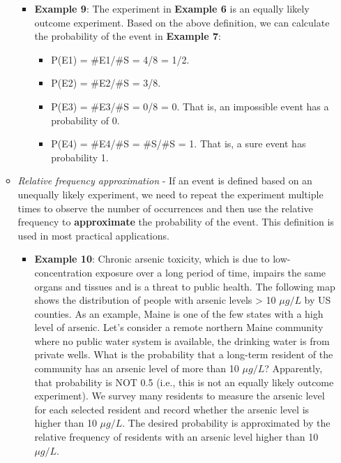 \documentclass[
]{book}
\providecommand{\tightlist}{%
  \setlength{\itemsep}{0pt}\setlength{\parskip}{0pt}}
\begin{document}
\begin{itemize}
\begin{itemize}
    \begin{itemize}
    \tightlist
    \item
      \textbf{Example 9}: The experiment in \textbf{Example 6} is an equally likely outcome experiment. Based on the above definition, we can calculate the probability of the event in \textbf{Example 7}:

      \begin{itemize}
      \tightlist
      \item
        P(E1) = \#E1/\#S = 4/8 = 1/2.
      \item
        P(E2) = \#E2/\#S = 3/8.
      \item
        P(E3) = \#E3/\#S = 0/8 = 0. That is, an impossible event has a probability of 0.
      \item
        P(E4) = \#E4/\#S = \#S/\#S = 1. That is, a sure event has probability 1.
      \end{itemize}
    \end{itemize}
  \item
    \emph{Relative frequency approximation} - If an event is defined based on an unequally likely experiment, we need to repeat the experiment multiple times to observe the number of occurrences and then use the relative frequency to \textbf{approximate} the probability of the event. This definition is used in most practical applications.

    \begin{itemize}
    \tightlist
    \item
      \textbf{Example 10}: Chronic arsenic toxicity, which is due to low-concentration exposure over a long period of time, impairs the same organs and tissues and is a threat to public health. The following map shows the distribution of people with arsenic levels \textgreater{} 10 \(\mu g/L\) by US counties. As an example, Maine is one of the few states with a high level of arsenic. Let's consider a remote northern Maine community where no public water system is available, the drinking water is from private wells. What is the probability that a long-term resident of the community has an arsenic level of more than 10 \(\mu g/L\)? Apparently, that probability is NOT 0.5 (i.e., this is not an equally likely outcome experiment). We survey many residents to measure the arsenic level for each selected resident and record whether the arsenic level is higher than 10 \(\mu g/L\). The desired probability is approximated by the relative frequency of residents with an arsenic level higher than 10 \(\mu g/L\).
    \end{itemize}
  \end{itemize}
\end{itemize}
\end{document}
